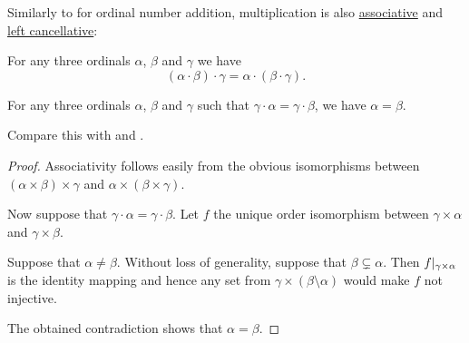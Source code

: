 \begin{proposition}\label{thm:ordinal_multiplication_algebraic_properties}
  Similarly to  for ordinal number addition, multiplication is also \hyperref[def:binary_operation/associative]{associative} and \hyperref[def:binary_operation/cancellative]{left cancellative}:
  \begin{thmenum}
     For any three ordinals \( \alpha \), \( \beta \) and \( \gamma \) we have
    \begin{equation*}
      (\alpha \cdot \beta) \cdot \gamma = \alpha \cdot (\beta \cdot \gamma).
    \end{equation*}

     For any three ordinals \( \alpha \), \( \beta \) and \( \gamma \) such that \( \gamma \cdot \alpha = \gamma \cdot \beta \), we have \( \alpha = \beta \).
  \end{thmenum}

  Compare this with  and .
\end{proposition}
\begin{proof}
   Associativity follows easily from the obvious isomorphisms between \( (\alpha \times \beta) \times \gamma \) and \( \alpha \times (\beta \times \gamma) \).

   Now suppose that \( \gamma \cdot \alpha = \gamma \cdot \beta \). Let \( f \) the unique order isomorphism between \( \gamma \times \alpha \) and \( \gamma \times \beta \).

  Suppose that \( \alpha \neq \beta \). Without loss of generality, suppose that \( \beta \subsetneq \alpha \). Then \( f\vert_{\gamma \times \alpha} \) is the identity mapping and hence any set from \( \gamma \times (\beta \setminus \alpha) \) would make \( f \) not injective.

  The obtained contradiction shows that \( \alpha = \beta \).
\end{proof}

